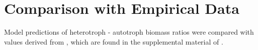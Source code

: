 \section{Comparison with Empirical Data}
\label{chap:mat:emp}
Model predictions of heterotroph - autotroph biomass ratios were compared with values derived from \cite{Cebrian2009}, which are found in the supplemental material of \cite{Harfoot2014}.

